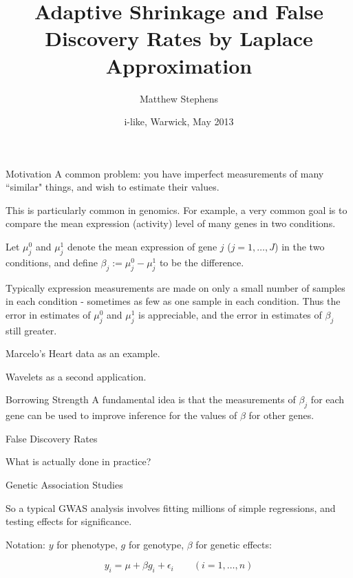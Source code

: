 \documentclass[ignorenonframetext]{beamer}
\title[Adaptive Shrinkage by Laplace Approximation]{Adaptive Shrinkage and False Discovery Rates by Laplace Approximation}
\author{Matthew Stephens} \date{i-like, Warwick,  May 2013 }
\begin{document}
\begin{frame}
  \titlepage
\end{frame}

\begin{frame}{Motivation}  
A common problem: you have imperfect measurements
of many ``similar" things, and wish to estimate their values. 

This is particularly common in genomics. For example,
 a very common goal is to compare the mean
expression (activity) level of many genes in two conditions.

Let $\mu^0_j$ and $\mu^1_j$ denote the mean expression 
of gene $j$ ($j=1,\dots,J$) in the two conditions, and define $\beta_j:= \mu^0_j - \mu^1_j$ to be the difference. 

Typically expression
measurements are made on only a small number of
samples in each condition - sometimes as few as one
sample in each condition. Thus the error in estimates
of $\mu^0_j$ and $\mu^1_j$ is appreciable, and the error
in estimates of $\beta_j$ still greater.

Marcelo's Heart data as an example.

Wavelets as a second application.
\end{frame}


\begin{frame}{Borrowing Strength}
A fundamental idea is
that the measurements of $\beta_j$ for each gene can be used to improve inference for the values of $\beta$ for other genes.
\end{frame}

\begin{frame}{False Discovery Rates}

What is actually done in practice?


\end{frame}



\begin{frame}{Genetic Association Studies}  

So a typical GWAS analysis involves fitting millions of simple regressions, and testing effects for significance.

\bigskip

Notation: $y$ for phenotype, $g$ for genotype, $\beta$ for genetic effects:

$$y_i = \mu + \beta g_i + \epsilon_i \qquad (i=1,\dots,n)$$
\end{frame}
\end{document}
